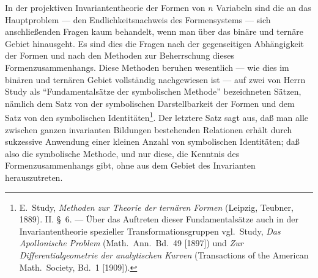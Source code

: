 \documentclass[12pt,a4paper]{article}
\begin{document}
In der projektiven Invariantentheorie der Formen von $n$ Variabeln sind die an das Hauptproblem --- den Endlichkeitsnachweis des Formensystems --- sich anschließenden Fragen kaum behandelt, wenn man über das binäre und ternäre Gebiet hinausgeht. Es sind dies die Fragen nach der gegenseitigen Abhängigkeit der Formen und nach den Methoden zur Beherrschung dieses Formenzusammenhangs. Diese Methoden beruhen wesentlich --- wie dies im binären und ternären Gebiet vollständig nachgewiesen ist --- auf zwei von Herrn Study als ``Fundamentalsätze der symbolischen Methode'' bezeichneten Sätzen, nämlich dem Satz von der symbolischen Darstellbarkeit der Formen und dem Satz von den symbolischen Identitäten\footnote{E.\ Study, \textit{Methoden zur Theorie der ternären Formen} (Leipzig, Teubner, 1889). II. \S\ 6. --- Über das Auftreten dieser Fundamentalsätze auch in der Invariantentheorie spezieller Transformationsgruppen vgl.\ Study, \textit{Das Apollonische Problem} (Math.\ Ann.\ Bd.~49 [1897]) und \textit{Zur Differentialgeometrie der analytischen Kurven} (Transactions of the American Math.\ Society, Bd.~1 [1909]).}. Der letztere Satz sagt aus, daß man alle zwischen ganzen invarianten Bildungen bestehenden Relationen erhält durch sukzessive Anwendung einer kleinen Anzahl von symbolischen Identitäten; daß also die symbolische Methode, und nur diese, die Kenntnis des Formenzusammenhangs gibt, ohne aus dem Gebiet des Invarianten herauszutreten.
\end{document}
